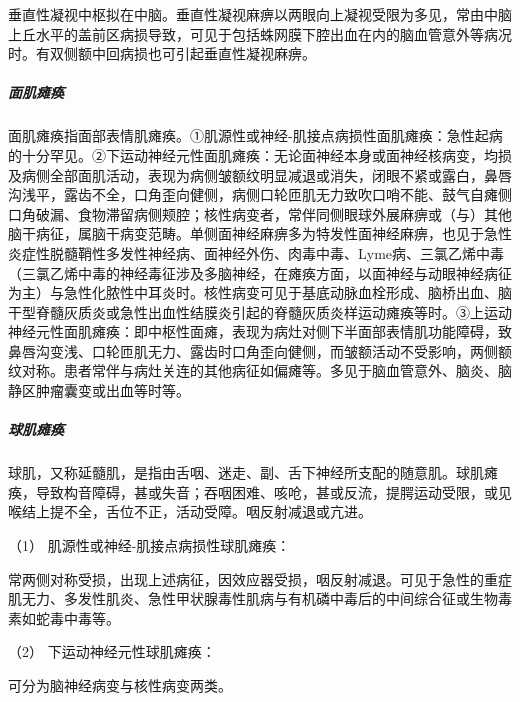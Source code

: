 垂直性凝视中枢拟在中脑。垂直性凝视麻痹以两眼向上凝视受限为多见，常由中脑上丘水平的盖前区病损导致，可见于包括蛛网膜下腔出血在内的脑血管意外等病况时。有双侧额中回病损也可引起垂直性凝视麻痹。

\subparagraph{面肌瘫痪}

面肌瘫痪指面部表情肌瘫痪。①肌源性或神经-肌接点病损性面肌瘫痪：急性起病的十分罕见。②下运动神经元性面肌瘫痪：无论面神经本身或面神经核病变，均损及病侧全部面肌活动，表现为病侧皱额纹明显减退或消失，闭眼不紧或露白，鼻唇沟浅平，露齿不全，口角歪向健侧，病侧口轮匝肌无力致吹口哨不能、鼓气自瘫侧口角破漏、食物滞留病侧颊腔；核性病变者，常伴同侧眼球外展麻痹或（与）其他脑干病征，属脑干病变范畴。单侧面神经麻痹多为特发性面神经麻痹，也见于急性炎症性脱髓鞘性多发性神经病、面神经外伤、肉毒中毒、Lyme病、三氯乙烯中毒（三氯乙烯中毒的神经毒征涉及多脑神经，在瘫痪方面，以面神经与动眼神经病征为主）与急性化脓性中耳炎时。核性病变可见于基底动脉血栓形成、脑桥出血、脑干型脊髓灰质炎或急性出血性结膜炎引起的脊髓灰质炎样运动瘫痪等时。③上运动神经元性面肌瘫痪：即中枢性面瘫，表现为病灶对侧下半面部表情肌功能障碍，致鼻唇沟变浅、口轮匝肌无力、露齿时口角歪向健侧，而皱额活动不受影响，两侧额纹对称。患者常伴与病灶关连的其他病征如偏瘫等。多见于脑血管意外、脑炎、脑静区肿瘤囊变或出血等时等。

\subparagraph{球肌瘫痪}

球肌，又称延髓肌，是指由舌咽、迷走、副、舌下神经所支配的随意肌。球肌瘫痪，导致构音障碍，甚或失音；吞咽困难、咳呛，甚或反流，提腭运动受限，或见喉结上提不全，舌位不正，活动受障。咽反射减退或亢进。

\hypertarget{text00018.htmlux5cux23CHP1-6-2-3-3-1}{}
（1） 肌源性或神经-肌接点病损性球肌瘫痪：

常两侧对称受损，出现上述病征，因效应器受损，咽反射减退。可见于急性的重症肌无力、多发性肌炎、急性甲状腺毒性肌病与有机磷中毒后的中间综合征或生物毒素如蛇毒中毒等。

\hypertarget{text00018.htmlux5cux23CHP1-6-2-3-3-2}{}
（2） 下运动神经元性球肌瘫痪：

可分为脑神经病变与核性病变两类。

